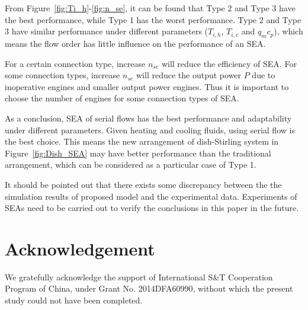 \documentclass[preprint,5p, twocolumn]{elsarticle}
\begin{document}
From Figure~\ref{fig:Ti_h}-\ref{fig:n_se}, it can be found that Type 2 and Type 3 have the best performance, while Type 1 has the worst performance. Type 2 and Type 3 have similar performance under different parameters ($T_{i,h}$, $T_{i,c}$ and $q_mc_p$), which means the flow order has little influence on the performance of an SEA.

For a certain connection type, increase $n_{se}$ will reduce the efficiency of SEA. For some connection types, increase $n_{se}$ will reduce the output power $P$ due to inoperative engines and smaller output power engines. Thus it is important to choose the number of engines for some connection types of SEA. 

As a conclusion, SEA of serial flows has the best performance and adaptability under different parameters. Given heating and cooling fluids, using serial flow is the best choice. This means the new arrangement of dish-Stirling system in Figure~\ref{fig:Dish_SEA} may have better performance than the traditional arrangement, which can be considered as a particular case of Type 1.

It should be pointed out that there exists some discrepancy between the the simulation results of proposed model and the experimental data. Experiments of SEAs need to be carried out to verify the conclusions in this paper in the future. 

\section*{Acknowledgement}
We gratefully acknowledge the support of International S\&T Cooperation Program of China, under Grant No. 2014DFA60990, without which the present study could not have been completed.

\clearpage
\printnomenclature[2.5cm]{}
\clearpage



\end{document}
